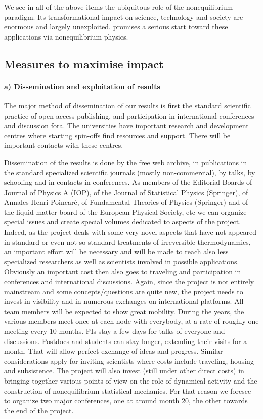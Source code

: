 We see in all of the above items the ubiquitous role of the nonequilibrium paradigm. Its
transformational impact on science, technology and society are enormous and largely
unexploited. \TheProject promises a serious start toward these applications via
nonequilibrium physics.



\subsection{Measures to maximise impact}

\paragraph{a) Dissemination and exploitation of results}

The major method of dissemination of our results is first the standard scientific practice
of open access publishing, and participation in international conferences and discussion
fora. The universities have important research and development centres where starting
spin-offs find resources and support.
%
There will be important contacts with these centres.

Dissemination of the results is done by the free web archive, in publications in the
standard specialized scientific journals (mostly non-commercial), by talks, by schooling and
in contacts in conferences. As members of the Editorial Boards of Journal of Physics A  (IOP), of the Journal of Statistical Physics (Springer), of Annales Henri Poincar\'e, of
Fundamental Theories of Physics (Springer) and of the liquid matter board of the European Physical Society, etc we can organize special issues and create
special volumes dedicated to aspects of the project. Indeed, as the project deals with some
very novel aspects that have not appeared in standard or even not so standard treatments of
irreversible thermodynamics, an important effort will be necessary and will be made to reach
also less specialized researchers as well as scientists involved in possible applications.
%
Obviously an important cost then also goes to traveling and participation in conferences and
international discussions. Again, since the project is not entirely mainstream and some
concepts/questions are quite new, the project needs to invest in visibility and in numerous
exchanges on international platforms.  All team members will be
expected to show great mobility.  During the years, the various members meet once at each
node with everybody, at a rate of roughly one meeting every 10 months. PIs stay a few days
for talks of everyone and discussions. Postdocs and students can stay
longer, extending their visits for a month. That will allow perfect exchange of ideas and
progress.  Similar considerations apply for inviting scientists where
costs include traveling, housing and subsistence.  The project will also invest (still under other
direct costs) in bringing together various points of view on the role of dynamical activity
and the construction of nonequilibrium statistical mechanics. For that reason we foresee to
organize two major conferences, one at around month 20, the other towards the end of the
project.  


